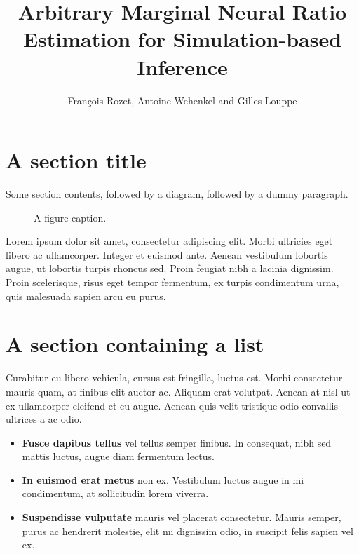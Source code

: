 \documentclass[12pt]{beamer}
\title{Arbitrary Marginal Neural Ratio Estimation for Simulation-based Inference}
\author{François Rozet, Antoine Wehenkel and Gilles Louppe}
\begin{document}
\begin{frame}[t]
\begin{multicols}{2}

\section{A section title}

Some section contents, followed by a diagram, followed by a dummy paragraph.

\begin{figure}
    \vspace{0.5\baselineskip}
    \centering
    \caption{A figure caption.}
\end{figure}

Lorem ipsum dolor sit amet, consectetur adipiscing elit. Morbi ultricies eget libero ac ullamcorper. Integer et euismod ante. Aenean vestibulum lobortis augue, ut lobortis turpis rhoncus sed. Proin feugiat nibh a lacinia dignissim. Proin scelerisque, risus eget tempor fermentum, \alert{ex turpis condimentum urna}, quis malesuada sapien arcu eu purus.

\section{A section containing a list}

Curabitur eu libero vehicula, cursus est fringilla, luctus est. Morbi consectetur mauris quam, at finibus elit auctor ac. Aliquam erat volutpat. Aenean at nisl ut ex ullamcorper eleifend et eu augue. Aenean quis velit tristique odio convallis ultrices a ac odio.

\begin{itemize}
    \item \textbf{Fusce dapibus tellus} vel tellus semper finibus. In consequat, nibh sed mattis luctus, augue diam fermentum lectus.
    \item \textbf{In euismod erat metus} non ex. Vestibulum luctus augue in mi condimentum, at sollicitudin lorem viverra.
    \item \textbf{Suspendisse vulputate} mauris vel placerat consectetur. Mauris semper, purus ac hendrerit molestie, elit mi dignissim odio, in suscipit felis sapien vel ex.
\end{itemize}


\end{multicols}
\end{frame}
\end{document}
